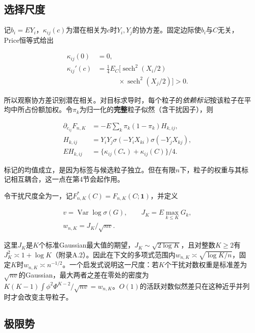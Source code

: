 \documentclass[11pt,a4paper]{article}
\begin{document}
\subsection{选择尺度}\label{ux9009ux62e9ux5c3aux5ea6}

记\(b_i=EY_i\)，\(\kappa_{ij}(c)\)为潜在相关为\(c\)时\(Y_i,Y_j\)的协方差。固定边际使\(b_i\)与\(C\)无关，Price恒等式\citep{price1958}给出

\[
\begin{aligned}
\kappa_{ij}(0)&=0,\\
\kappa_{ij}'(c)&=\tfrac14 E_C[\operatorname{sech}^2(X_i/2)\\
&\qquad\quad{}\times\operatorname{sech}^2(X_j/2)]>0.
\end{aligned}
\tag{5}
\]

所以观察协方差识别潜在相关。对目标求导时，每个粒子的\emph{依赖标记}按该粒子在平均中所占份额加权。令\(\pi_k\)为归一化的\textbf{完整}粒子似然（含干扰因子），则

\[
\begin{aligned}
\partial_{c_{ij}}F_{n,K}
&=-E\sum_k\pi_k(1-\pi_k)H_{k,ij},\\
H_{k,ij}&=Y_iY_j\sigma(-Y_iX_{ki})\sigma(-Y_jX_{kj}),\\
EH_{k,ij}&=\{\kappa_{ij}(C_*)+\kappa_{ij}(C)\}/4.
\end{aligned}
\tag{6}
\]

标记的均值成立，是因为标签与候选粒子独立。但在有限\(n\)下，粒子的权重与其标记相互耦合，这一点在第4节会起作用。

令干扰尺度全为一，记\(F_{n,K}^*(C)=F_{n,K}(C;\mathbf1)\)，并定义

\[
\begin{gathered}
v=\operatorname{Var}\log\sigma(G),\qquad J_K=E\max_{k\le K}G_k,\\
w_{n,K}=J_K/\sqrt{nv}.
\end{gathered}
\tag{7}
\]

这里\(J_K\)是\(K\)个标准Gaussian最大值的期望，\(J_K\sim\sqrt{2\log K}\)，且对整数\(K\ge2\)有\(J_K^2\asymp1+\log K\)（附录A.2）。因此在下文的多项式范围内\(w_{n,K}\asymp\sqrt{\log K/n}\)，固定\(K\)时\(w_{n,K}\asymp n^{-1/2}\)。一个启发式说明这一尺度：若\(K\)个干扰对数权重是标准差为\(\sqrt{nv}\)的Gaussian，最大两者之差在零处的密度为\(K(K-1)\int\phi^2\Phi^{K-2}/\sqrt{nv}=w_{n,K}\)。\(O(1)\)的活跃对数似然差只在这种近乎并列时才会改变主导粒子。

\subsection{极限势}\label{ux6781ux9650ux52bf}
\end{document}
